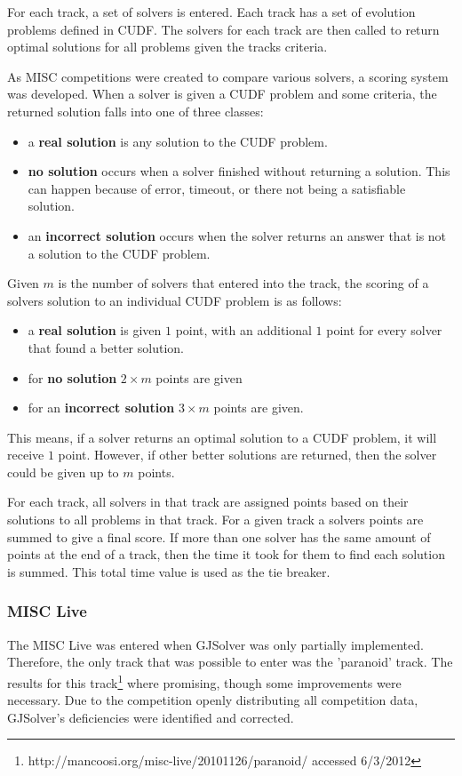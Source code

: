 For each track, a set of solvers is entered.
Each track has a set of evolution problems defined in CUDF.
The solvers for each track are then called to return optimal solutions for all problems given the tracks criteria.

As MISC competitions were created to compare various solvers, a scoring system was developed. 
When a solver is given a CUDF problem and some criteria, the returned solution falls into one of three classes:
\begin{itemize}
  \item a \textbf{real solution} is any solution to the CUDF problem.
  \item \textbf{no solution} occurs when a solver finished without returning a solution. This can happen because of error, timeout, or there not being a satisfiable solution.
  \item an \textbf{incorrect solution} occurs when the solver returns an answer that is not a solution to the CUDF problem.
\end{itemize}

Given $m$ is the number of solvers that entered into the track, the scoring of a solvers solution to an individual CUDF problem is as follows:
\begin{itemize}
  \item a \textbf{real solution} is given $1$ point, with an additional $1$ point for every solver that found a better solution.
  \item for \textbf{no solution} $2\times m$ points are given
  \item for an \textbf{incorrect solution} $3 \times m$ points are given.
\end{itemize}
This means, if a solver returns an optimal solution to a CUDF problem, it will receive $1$ point.
However, if other better solutions are returned, then the solver could be given up to $m$ points.

For each track, all solvers in that track are assigned points based on their solutions to all problems in that track.
For a given track a solvers points are summed to give a final score.
If more than one solver has the same amount of points at the end of a track, then the time it took for them to find each solution is summed.
This total time value is used as the tie breaker.

\subsubsection{MISC Live}
The MISC Live was entered when GJSolver was only partially implemented.
Therefore, the only track that was possible to enter was the 'paranoid' track.
The results for this track\footnote{http://mancoosi.org/misc-live/20101126/paranoid/ accessed 6/3/2012} where promising, though some improvements were necessary.
Due to the competition openly distributing all competition data, GJSolver's deficiencies were identified and corrected.

